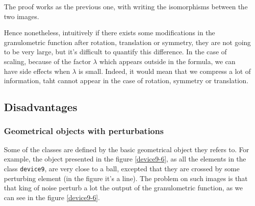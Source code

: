 
The proof works as the previous one, with writing the isomorphisms between the two images.

Hence nonetheless, intuitively if there exists some modifications in the granulometric function after rotation, translation or symmetry, they are not going to be very large, but it's difficult to quantify this difference. In the case of scaling, because of the factor $\lambda$ which appears outside in the formula, we can have side effects when $\lambda$ is small. Indeed, it would mean that we compress a lot of information, taht cannot appear in the case of rotation, symmetry or translation.

\subsection{Disadvantages}

\subsubsection{Geometrical objects with perturbations}

\label{geo-perturb}

Some of the classes are defined by the basic geometrical object they refers to. For example, the object presented in the figure \ref{device9-6}, as all the elements in the class \texttt{device9}, are very close to a ball, excepted that they are crossed by some perturbing element (in the figure it's a line). The problem on such images is that that king of noise perturb a lot the output of the granulometric function, as we can see in the figure \ref{device9-6}.


